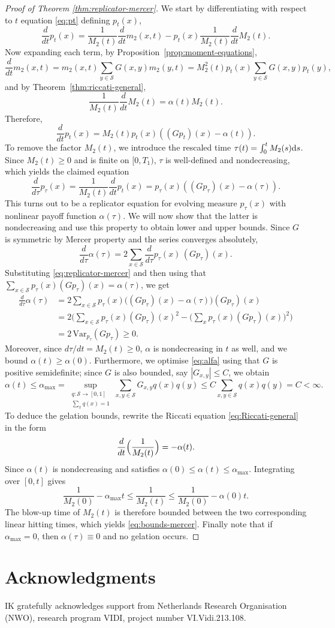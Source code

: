 \documentclass[12pt,twoside]{article}
\begin{document}
\begin{proof}[Proof of Theorem \ref{thm:replicator-mercer}]
We start by differentiating with respect to $t$ equation \eqref{eq:pt} defining $p_t(x)$,
\[
\frac{d}{dt}p_t(x)
=
\frac{1}{M_2(t)}\frac{d}{dt}m_2(x,t)
-
p_t(x)\frac{1}{M_2(t)}\frac{d}{dt}M_2(t).
\]
Now expanding each term, by Proposition~\ref{prop:moment-equations},
\[
\frac{d}{dt}m_2(x,t)
=
m_2(x,t)\sum_{y\in\mathcal S}G(x,y)m_2(y,t)=
M_2^2(t)p_t(x)\sum_{y\in\mathcal S } G(x,y)p_t(y),
\]
and by Theorem~\ref{thm:riccati-general},
\[
\frac{1}{M_2(t)}\frac{d}{dt}M_2(t)
=
\alpha(t)M_2(t).
\]
Therefore,
\[
\frac{d}{dt}p_t(x)
=
M_2(t)p_t(x)
\left((Gp_t)(x)-\alpha(t)\right).
\]
To remove the factor $M_2(t)$, we introduce the rescaled time $\tau(t)=\int_0^t M_2(s){\rm d}s$. Since $M_2(t)\ge 0$ and is finite on
$[0,T_1)$, $\tau$ is well-defined and nondecreasing, which yields the claimed equation 
\[
\frac{d}{d\tau}p_\tau(x)=
\frac{1}{M_2(t)}
\frac{d}{dt}p_t(x)=p_\tau(x)\left((Gp_\tau)(x)-\alpha(\tau)\right).
\]
This turns out to be a replicator equation for evolving measure $p_\tau(x)$ with nonlinear payoff function $\alpha(\tau)$. We will now show that the latter is nondecreasing and use this property to obtain lower and upper bounds.
Since $G$ is symmetric by Mercer property and the series converges absolutely,
\[
\frac{d}{d\tau}\alpha(\tau)
=
2\sum_{x\in\mathcal S} \frac{d}{d\tau}p_\tau(x)\,(Gp_\tau)(x).
\]
Substituting \eqref{eq:replicator-mercer} and then using that $\sum_{x\in\mathcal S} p_\tau(x)(Gp_\tau)(x)=\alpha(\tau)$, we get
$$
\begin{aligned}
\frac{d}{d\tau}\alpha(\tau) 
&= 2\sum_{x\in\mathcal S} p_\tau(x)\bigl((Gp_\tau)(x)-\alpha(\tau)\bigr)(Gp_\tau)(x)\\
&=2\Big(\sum_{x\in\mathcal S} p_\tau(x)(Gp_\tau)(x)^2-\big(\sum_x p_\tau(x)(Gp_\tau)(x)\big)^2\Big)\\
&=2\,\mathrm{Var}_{p_\tau}(Gp_\tau)\ge 0.
\end{aligned}
$$
Moreover, since $d\tau/dt=M_2(t)\ge 0$, $\alpha$ is nondecreasing in $t$ as well, and we bound $\alpha(t)\ge\alpha(0)$.
Furthermore, we optimise \eqref{eq:alfa} using that $G$ is positive semidefinite; since $G$ is also bounded, say $|G_{x,y}|\le C$, we obtain
\[
\alpha(t)\le\alpha_{\max}
=
\sup_{\substack{q:\mathcal S\to[0,1]\\ \sum_x q(x)=1}}
\sum_{x,y\in\mathcal S} G_{x,y}q(x)q(y)
\le C\sum_{x,y\in\mathcal S} q(x)q(y)=C<\infty.
\]
To deduce the gelation bounds, rewrite the Riccati equation
\eqref{eq:Riccati-general} in the form
\[
\frac{d}{dt}\Bigl(\frac{1}{M_2(t)}\Bigr)=-\alpha(t).
\]
Since $\alpha(t)$ is nondecreasing and satisfies
$
\alpha(0)\le \alpha(t)\le \alpha_{\max}$.
Integrating over $[0,t]$ gives
\[
\frac{1}{M_2(0)}-\alpha_{\max} t \le \frac{1}{M_2(t)}\le\frac{1}{M_2(0)}-\alpha(0)t.
\]
The blow-up time of $M_2(t)$ is therefore bounded between the two corresponding linear hitting times, which yields \eqref{eq:bounds-mercer}. Finally note that if $\alpha_{\max}=0$, then $\alpha(\tau)\equiv 0$ and no gelation occurs.
\end{proof}


\section*{Acknowledgments}
 IK gratefully acknowledges support from Netherlands Research Organisation (NWO), research program VIDI, project number VI.Vidi.213.108.



\end{document}
